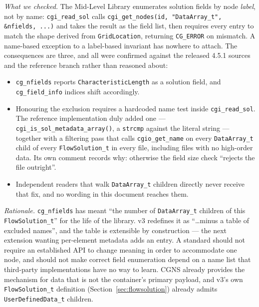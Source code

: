 \documentclass[11pt,letterpaper]{article}
\newif\ifvfourdraft
\newenvironment{v4block}{\ifvfourdraft\color{v4violet}\fi\ignorespaces}{\par}
\begin{document}
{\begin{v4block}
\begin{enumerate}[leftmargin=1.4em,itemsep=0.5em]
    \textit{What we checked.}  The Mid-Level Library enumerates solution fields
    by node \emph{label}, not by name: \texttt{cgi\_read\_sol} calls
    \texttt{cgi\_get\_nodes(id, "DataArray\_t", \&nfields, ...)} and takes the
    result as the field list, then requires every entry to match the shape
    derived from \texttt{GridLocation}, returning \texttt{CG\_ERROR} on
    mismatch.  A name-based exception to a label-based invariant has nowhere to
    attach.  The consequences are three, and all were confirmed against the
    released 4.5.1 sources and the reference branch rather than reasoned about:
    \begin{itemize}[nosep,leftmargin=1.2em]
      \item \texttt{cg\_nfields} reports \texttt{CharacteristicLength} as a
        solution field, and \texttt{cg\_field\_info} indices shift accordingly.
      \item Honouring the exclusion requires a hardcoded name test inside
        \texttt{cgi\_read\_sol}.  The reference implementation duly added one
        --- \texttt{cgi\_is\_sol\_metadata\_array()}, a \texttt{strcmp} against
        the literal string --- together with a filtering pass that calls
        \texttt{cgio\_get\_name} on every \texttt{DataArray\_t} child of every
        \texttt{FlowSolution\_t} in every file, including files with no
        high-order data.  Its own comment records why: otherwise the field size
        check ``rejects the file outright''.
      \item Independent readers that walk \texttt{DataArray\_t} children
        directly never receive that fix, and no wording in this document
        reaches them.
    \end{itemize}

    \textit{Rationale.}  \texttt{cg\_nfields} has meant ``the number of
    \texttt{DataArray\_t} children of this \texttt{FlowSolution\_t}'' for the
    life of the library.  v3 redefines it as ``\ldots minus a table of excluded
    names'', and the table is extensible by construction --- the next extension
    wanting per-element metadata adds an entry.  A standard should not require
    an established API to change meaning in order to accommodate one node, and
    should not make correct field enumeration depend on a name list that
    third-party implementations have no way to learn.  CGNS already provides the
    mechanism for data that is not the container's primary payload, and v3's own
    \texttt{FlowSolution\_t} definition (Section~\ref{sec:flowsolution}) already
    admits \texttt{UserDefinedData\_t} children.


\end{enumerate}
\end{v4block}}
\end{document}
